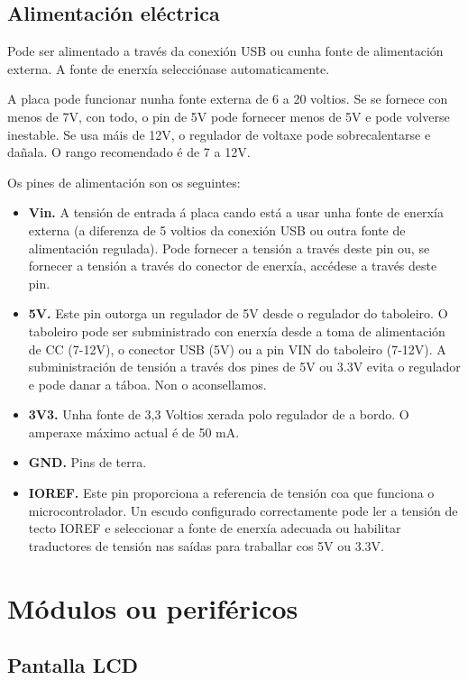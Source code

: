\documentclass[11pt,twoside]{book}
\begin{document}
\subsection{Alimentación eléctrica}

Pode ser alimentado a través da conexión USB ou cunha fonte de alimentación externa. A fonte de enerxía selecciónase automaticamente. 

A placa pode funcionar nunha fonte externa de 6 a 20 voltios. Se se fornece con menos de 7V, con todo, o pin de 5V pode fornecer menos de 5V e pode volverse inestable. Se usa máis de 12V, o regulador de voltaxe pode sobrecalentarse e dañala. O rango recomendado é de 7 a 12V.

Os pines de alimentación son os seguintes:

\begin{itemize}
\item \textbf{Vin.} A tensión de entrada á placa cando está a usar unha fonte de enerxía externa (a diferenza de 5 voltios da conexión USB ou outra fonte de alimentación regulada). Pode fornecer a tensión a través deste pin ou, se fornecer a tensión a través do conector de enerxía, accédese a través deste pin.
\item \textbf{5V.} Este pin outorga un regulador de 5V desde o regulador do taboleiro. O taboleiro pode ser subministrado con enerxía desde a toma de alimentación de CC (7-12V), o conector USB (5V) ou a pin VIN do taboleiro (7-12V). A subministración de tensión a través dos pines de 5V ou 3.3V evita o regulador e pode danar a táboa. Non o aconsellamos.
\item \textbf{3V3.} Unha fonte de 3,3 Voltios xerada polo regulador de a bordo. O amperaxe máximo actual é de 50 mA.
\item \textbf{GND.} Pins de terra.
\item \textbf{IOREF.} Este pin proporciona a referencia de tensión coa que funciona o microcontrolador. Un escudo configurado correctamente pode ler a tensión de tecto IOREF e seleccionar a fonte de enerxía adecuada ou habilitar traductores de tensión nas saídas para traballar cos 5V ou 3.3V.
\end{itemize}

\section{Módulos ou periféricos}

\subsection{Pantalla LCD}
\end{document}
